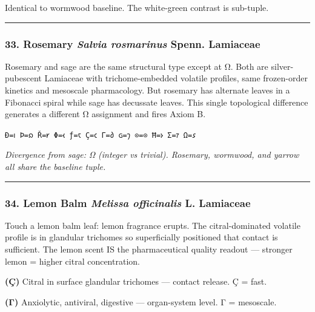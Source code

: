 \documentclass[12pt,a4paper]{article}
\begin{document}
Identical to wormwood baseline. The white-green contrast is sub-tuple.

\begin{center}\rule{0.5\linewidth}{0.5pt}\end{center}

\hypertarget{rosemary-salvia-rosmarinus-spenn.-lamiaceae}{%
\subsubsection{\texorpdfstring{33. Rosemary \textbar{} \emph{Salvia
rosmarinus} Spenn. \textbar{}
Lamiaceae}{33. Rosemary \textbar{} Salvia rosmarinus Spenn. \textbar{} Lamiaceae}}\label{rosemary-salvia-rosmarinus-spenn.-lamiaceae}}

Rosemary and sage are the same structural type except at Ω. Both are
silver-pubescent Lamiaceae with trichome-embedded volatile profiles,
same frozen-order kinetics and mesoscale pharmacology. But rosemary has
alternate leaves in a Fibonacci spiral while sage has decussate leaves.
This single topological difference generates a different Ω assignment
and fires Axiom B.

\texttt{Ð=𐑦\ Þ=𐑸\ Ř=𐑾\ Φ=𐑬\ ƒ=𐑱\ Ç=𐑤\ Γ=𐑔\ ɢ=𐑠\ ⊙=⊙\ Ħ=𐑶\ Σ=𐑳\ Ω=𐑭}

\emph{Divergence from sage: Ω (integer vs trivial). Rosemary, wormwood,
and yarrow all share the baseline tuple.}

\begin{center}\rule{0.5\linewidth}{0.5pt}\end{center}

\hypertarget{lemon-balm-melissa-officinalis-l.-lamiaceae}{%
\subsubsection{\texorpdfstring{34. Lemon Balm \textbar{} \emph{Melissa
officinalis} L. \textbar{}
Lamiaceae}{34. Lemon Balm \textbar{} Melissa officinalis L. \textbar{} Lamiaceae}}\label{lemon-balm-melissa-officinalis-l.-lamiaceae}}

Touch a lemon balm leaf: lemon fragrance erupts. The citral-dominated
volatile profile is in glandular trichomes so superficially positioned
that contact is sufficient. The lemon scent IS the pharmaceutical
quality readout --- stronger lemon = higher citral concentration.

\textbf{(Ç)} Citral in surface glandular trichomes --- contact release.
Ç = fast.

\textbf{(Γ)} Anxiolytic, antiviral, digestive --- organ-system level. Γ
= mesoscale.
\end{document}
